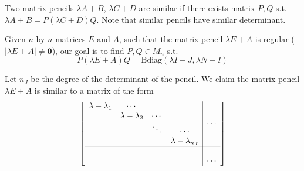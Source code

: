 \documentclass{article}
\newcommand{\0}{\mathbf{0}}
\newcommand{\Bdiag}{\text{Bdiag}}
\newcommand{\pen}[2]{\lambda#1+#2}
\newcommand{\penEA}{\pen{E}{A}}
\begin{document}
Two matrix pencils $\lambda A + B$, $\lambda C + D$ are similar if there exists matrix $P, Q$ s.t. $\lambda A + B = P (\lambda C + D) Q$.
Note that similar pencils have similar determinant.

Given $n$ by $n$ matrices $E$ and $A$, such that the matrix pencil $\lambda E + A$ is regular ($|\lambda E+A| \neq \0$), our goal is to find $P,Q \in M_n$ s.t.
\begin{equation*}
    P (\lambda E + A) Q = \Bdiag(\lambda I - J, \lambda N - I)
\end{equation*}

Let $n_J$ be the degree of the determinant of the pencil. We claim the matrix pencil $\penEA$ is similar to a matrix of the form
\begin{equation}
    \label{equ:half_upper_triangular_general}
    \left[\begin{array}{c|c}
        \begin{matrix}
            \lambda-\lambda_1&\cdots&&\\
            &\lambda-\lambda_2&\cdots&\\
            &&\ddots&\cdots\\
            &&&\lambda-\lambda_{n_J}\\
        \end{matrix}&\cdots\\
        \hline\\
        &\cdots\\
    \end{array}\right]
\end{equation}
\end{document}
